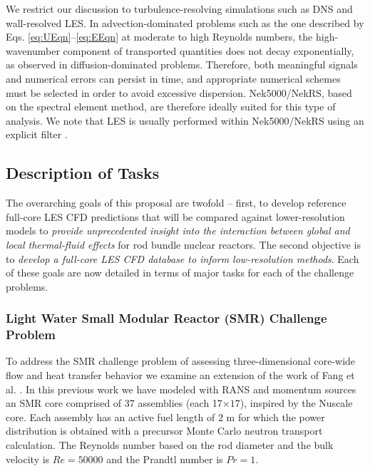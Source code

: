 We restrict our discussion to turbulence-resolving simulations such as DNS and
wall-resolved LES. In advection-dominated problems such as the one described by
Eqs. \ref{eq:UEqn}--\ref{eq:EEqn} at moderate to high Reynolds numbers, the
high-wavenumber component of transported quantities does not decay
exponentially, as observed in diffusion-dominated problems. Therefore, both
meaningful signals and numerical errors can persist in time, and appropriate
numerical schemes must be selected in order to avoid excessive dispersion.
Nek5000/NekRS, based on the spectral element method, are therefore ideally
suited for this type of analysis. We note that LES is usually performed within
Nek5000/NekRS using an explicit filter \cite{schlatter21}.

\vspace{-.25in}
\subsection{Description of Tasks}
\label{sec:tasks}
\vspace{-.2in}


The overarching goals of this proposal are twofold -- first, to develop
reference full-core LES CFD predictions that will be compared against
lower-resolution models to {\it provide unprecedented insight into the interaction
between global and local thermal-fluid effects} for rod bundle nuclear reactors. The second
objective is to {\it develop a full-core LES CFD database to inform low-resolution methods}. Each of these
goals are now detailed in terms of major tasks for each of the challenge
problems.

\vspace{-.25in}
\subsubsection{Light Water Small Modular Reactor (SMR) Challenge Problem}
\vspace{-.2in}

To address the SMR challenge problem of assessing three-dimensional core-wide flow and heat transfer behavior we examine an extension of the work of Fang et al. \cite{Fang2021}.
In this previous work we have modeled with RANS and momentum sources an SMR core comprised of 37 assemblies (each 17$\times 17$), inspired by the Nuscale core. Each assembly has an active fuel length of $2$ m for which the power distribution is obtained with a precursor Monte Carlo neutron transport calculation. The Reynolds number based on the rod diameter and the bulk velocity is $Re=50000$ and the Prandtl number is $Pr=1$.

